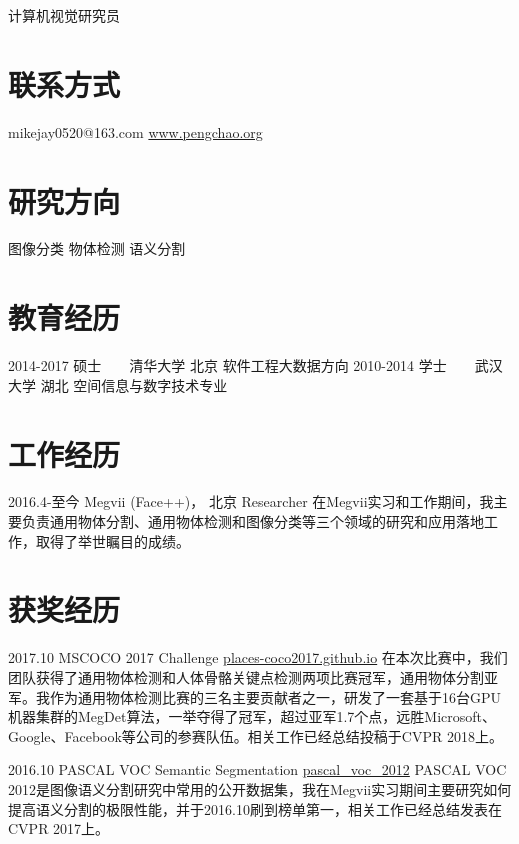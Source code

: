 \documentclass[]{friggeri-cv}
\begin{document}
       {计算机视觉研究员}

\begin{aside}
  \section{联系方式}
    mikejay0520@163.com
    \href{http://www.pengchao.org}{www.pengchao.org}
  \section{研究方向}
    图像分类
    物体检测
    语义分割
\end{aside}

\section{教育经历}
\begin{entrylist}
  \entry
    {2014-2017}
    {硕士~~~~清华大学}
    {北京}
    {软件工程大数据方向}
  \entry
    {2010-2014}
    {学士~~~~武汉大学}
    {湖北}
    {空间信息与数字技术专业}
\end{entrylist}


\section{工作经历}
\begin{entrylist}
  \entry
    {2016.4-至今}
    {Megvii (Face++)， 北京}
    {Researcher}
    {在Megvii实习和工作期间，我主要负责通用物体分割、通用物体检测和图像分类等三个领域的研究和应用落地工作，取得了举世瞩目的成绩。}

\end{entrylist}

\section{获奖经历}
  \begin{entrylist}
  \entry
    {2017.10}
    {MSCOCO 2017 Challenge}
    {\href{https://places-coco2017.github.io/}{places-coco2017.github.io}}
    {在本次比赛中，我们团队获得了通用物体检测和人体骨骼关键点检测两项比赛冠军，通用物体分割亚军。我作为通用物体检测比赛的三名主要贡献者之一，研发了一套基于16台GPU机器集群的MegDet算法，一举夺得了冠军，超过亚军1.7个点，远胜Microsoft、Google、Facebook等公司的参赛队伍。相关工作已经总结投稿于CVPR 2018上。}

    \entry
    {2016.10}
    {PASCAL VOC Semantic Segmentation}
    {\href{http://host.robots.ox.ac.uk:8080/leaderboard/displaylb.php?challengeid=11&compid=6}{pascal\_voc\_2012}}
    {PASCAL VOC 2012是图像语义分割研究中常用的公开数据集，我在Megvii实习期间主要研究如何提高语义分割的极限性能，并于2016.10刷到榜单第一，相关工作已经总结发表在CVPR 2017上。}
  \end{entrylist}
\end{document}
